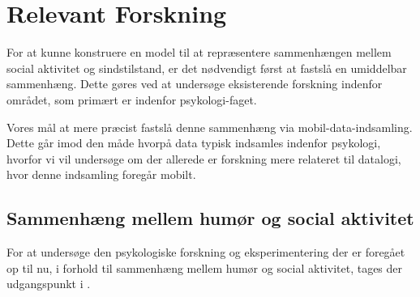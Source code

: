 \section{Relevant Forskning}
For at kunne konstruere en model til at repræsentere sammenhængen mellem social aktivitet og sindstilstand, er det nødvendigt først at fastslå en umiddelbar sammenhæng.
Dette gøres ved at undersøge eksisterende forskning indenfor området, som primært er indenfor psykologi-faget.

Vores mål at mere præcist fastslå denne sammenhæng via mobil-data-indsamling.
Dette går imod den måde hvorpå data typisk indsamles indenfor psykologi, hvorfor vi vil undersøge om der allerede er forskning mere relateret til datalogi, hvor denne indsamling foregår mobilt.

\subsection{Sammenhæng mellem humør og social aktivitet}
For at undersøge den psykologiske forskning og eksperimentering der er foregået op til nu, i forhold til sammenhæng mellem humør og social aktivitet, tages der udgangspunkt i \citet{whelan}.

